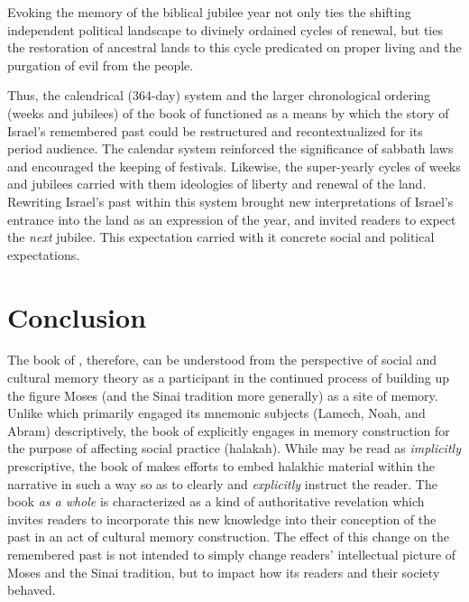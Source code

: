 
\noindent
Evoking the memory of the biblical jubilee year not only ties the shifting independent political landscape to divinely ordained cycles of renewal, but ties the restoration of ancestral lands to this cycle predicated on proper living and the purgation of evil from the people. 

Thus, the calendrical (364-day) system and the larger chronological ordering (weeks and jubilees) of the book of \jub functioned as a means by which the story of Israel's remembered past could be restructured and recontextualized for its \secondtemple period audience. The calendar system reinforced the significance of sabbath laws and encouraged the keeping of festivals. Likewise, the super-yearly cycles of weeks and jubilees carried with them ideologies of liberty and renewal of the land. Rewriting Israel's past within this system brought new interpretations of Israel's entrance into the land as an expression of the \jub year, and invited readers to expect the \emph{next} jubilee. This expectation carried with it concrete social and political expectations.

\section{Conclusion}

The book of \jub, therefore, can be understood from the perspective of social and cultural memory theory as a participant in the continued process of building up the figure Moses (and the Sinai tradition more generally) as a site of memory. Unlike \ga which primarily engaged its mnemonic subjects (Lamech, Noah, and Abram) descriptively, the book of \jub explicitly engages in memory construction for the purpose of affecting social practice (halakah). While \ga may be read as \emph{implicitly} prescriptive, the book of \jub makes efforts to embed halakhic material within the narrative in such a way so as to clearly and \emph{explicitly} instruct the reader. The book \emph{as a whole} is characterized as a kind of authoritative revelation which invites readers to incorporate this new knowledge into their conception of the past in an act of cultural memory construction. The effect of this change on the remembered past is not intended to simply change readers' intellectual picture of Moses and the Sinai tradition, but to impact how its readers and their society behaved.

